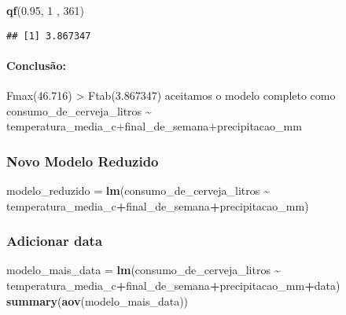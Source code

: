 \documentclass[
]{article}
\newenvironment{Shaded}{\begin{snugshade}}{\end{snugshade}}
\newcommand{\DecValTok}[1]{\textcolor[rgb]{0.00,0.00,0.81}{#1}}
\newcommand{\FloatTok}[1]{\textcolor[rgb]{0.00,0.00,0.81}{#1}}
\newcommand{\FunctionTok}[1]{\textcolor[rgb]{0.13,0.29,0.53}{\textbf{#1}}}
\newcommand{\NormalTok}[1]{#1}
\newcommand{\OtherTok}[1]{\textcolor[rgb]{0.56,0.35,0.01}{#1}}
\newcommand{\SpecialCharTok}[1]{\textcolor[rgb]{0.81,0.36,0.00}{\textbf{#1}}}
\begin{document}
\begin{Shaded}
\begin{Highlighting}[]
\FunctionTok{qf}\NormalTok{(}\FloatTok{0.95}\NormalTok{, }\DecValTok{1}\NormalTok{ , }\DecValTok{361}\NormalTok{)}
\end{Highlighting}
\end{Shaded}

\begin{verbatim}
## [1] 3.867347
\end{verbatim}

\hypertarget{conclusuxe3o-6}{%
\paragraph{Conclusão:}\label{conclusuxe3o-6}}

Fmax(46.716) \textgreater{} Ftab(3.867347) aceitamos o modelo completo
como consumo\_de\_cerveja\_litros \textasciitilde{}
temperatura\_media\_c+final\_de\_semana+precipitacao\_mm

\hypertarget{novo-modelo-reduzido-1}{%
\subsubsection{Novo Modelo Reduzido}\label{novo-modelo-reduzido-1}}

\begin{Shaded}
\begin{Highlighting}[]
\NormalTok{modelo\_reduzido }\OtherTok{=} \FunctionTok{lm}\NormalTok{(consumo\_de\_cerveja\_litros }\SpecialCharTok{\textasciitilde{}}\NormalTok{ temperatura\_media\_c}\SpecialCharTok{+}\NormalTok{final\_de\_semana}\SpecialCharTok{+}\NormalTok{precipitacao\_mm)}
\end{Highlighting}
\end{Shaded}

\hypertarget{adicionar-data-2}{%
\subsubsection{Adicionar data}\label{adicionar-data-2}}

\begin{Shaded}
\begin{Highlighting}[]
\NormalTok{modelo\_mais\_data }\OtherTok{=} \FunctionTok{lm}\NormalTok{(consumo\_de\_cerveja\_litros }\SpecialCharTok{\textasciitilde{}}\NormalTok{ temperatura\_media\_c}\SpecialCharTok{+}\NormalTok{final\_de\_semana}\SpecialCharTok{+}\NormalTok{precipitacao\_mm}\SpecialCharTok{+}\NormalTok{data)}
\FunctionTok{summary}\NormalTok{(}\FunctionTok{aov}\NormalTok{(modelo\_mais\_data))}
\end{Highlighting}
\end{Shaded}
\end{document}
